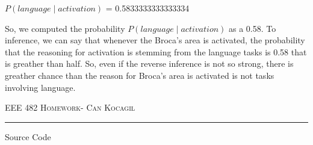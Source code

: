 \documentclass[12pt]{amsart}
\makeatletter
\def\section{\@startsection{section}{1}%
  \z@{.7\linespacing\@plus\linespacing}{.5\linespacing}%
  {\normalfont\scshape}}%
\makeatother
\begin{document}
$P(language \mid activation)$ = 0.5833333333333334

So, we computed the probability $P(language \mid activation)$ as a 0.58.  To inference, we can say that whenever the Broca’s area is activated, the probability that the reasoning for activation is stemming from the language tasks is 0.58 that is greather than half. So, even if the reverse inference is not so strong, there is greather chance than the reason for Broca’s area is activated is not tasks involving language.

\newpage
{\scshape EEE 482} \hfill {\scshape \large  Homework-\relax} \hfill {\scshape Can Kocagil}
\smallskip
\hrule
\vspace{2mm}

\section{Source Code}
\end{document}
